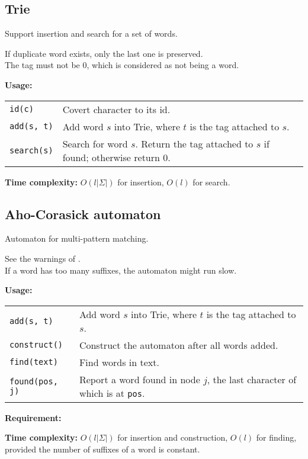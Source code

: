 \subsection{Trie} \label{trie}
Support insertion and search for a set of words. \par
\Warning If duplicate word exists, only the last one is preserved. \\
\Warning The tag must not be 0, which is considered as not being a word. \par
\textbf{Usage:} \\[0.1cm]
\begin{tabular}{p{2.5cm} p{9cm}}
  \lstinline|id(c)| & Covert character to its id.  \\
  \lstinline|add(s, t)| & Add word $s$ into Trie, where $t$ is the tag attached to $s$.  \\
  \lstinline|search(s)| & Search for word $s$. Return the tag attached to $s$ if found; otherwise return 0.  \\
\end{tabular} \par
\textbf{Time complexity:} $O(l|\Sigma|)$ for insertion, $O(l)$ for search. \par


\subsection{Aho-Corasick automaton}
Automaton for multi-pattern matching. \par
\Warning See the warnings of . \\
\Warning If a word has too many suffixes, the automaton might run slow. \par
\textbf{Usage:} \\[0.1cm]
\begin{tabular}{p{2.5cm} p{9cm}}
  \lstinline|add(s, t)| & Add word $s$ into Trie, where $t$ is the tag attached to $s$.  \\
  \lstinline|construct()| & Construct the automaton after all words added. \\
  \lstinline|find(text)| & Find words in text. \\
  \lstinline|found(pos, j)| & Report a word found in node $j$, the last character of which is at \lstinline|pos|. \\
\end{tabular} \par
\textbf{Requirement:} \\
 \par
\textbf{Time complexity:} $O(l|\Sigma|)$ for insertion and construction, $O(l)$ for finding, provided the number of suffixes of a word is constant. \par


